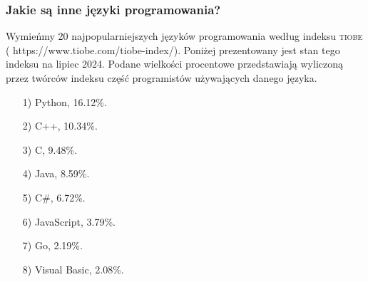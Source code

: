 \documentclass[10pt,t]{beamer}
\begin{document}
\begin{frame}
  \frametitle{Jakie są inne języki programowania?}


  Wymieńmy 20 najpopularniejszych języków programowania według indeksu
  \textsc{tiobe} (
  {https://www.tiobe.com/tiobe-index/}). Poniżej prezentowany jest stan
  tego indeksu na lipiec 2024. Podane wielkości procentowe przedstawiają
  wyliczoną przez twórców indeksu część programistów używających danego
  języka.

  \begin{itemize}

  \item[1)] Python, 16.12\%.

  \item[2)] C++, 10.34\%.

  \item[3)] C, 9.48\%.

  \item[4)] Java, 8.59\%.

  \item[5)] C\#, 6.72\%.

  \item[6)] JavaScript, 3.79\%.

  \item[7)] Go, 2.19\%.

  \item[8)] Visual Basic, 2.08\%.

  \end{itemize}

\end{frame}
\end{document}

